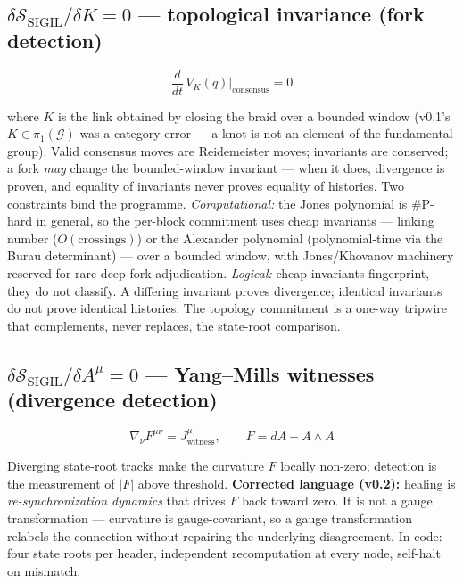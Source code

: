 \documentclass[10pt,a4paper]{article}
\newcommand{\SSIGIL}{\mathcal{S}_{\mathrm{SIGIL}}}
\begin{document}
\subsection{$\delta\SSIGIL/\delta K = 0$ — topological invariance (fork detection)}

\begin{equation}
\frac{d}{dt}\,V_K(q)\Big|_{\mathrm{consensus}} = 0
\end{equation}

where $K$ is the link obtained by closing the braid over a bounded window (v0.1's
$K \in \pi_1(\mathcal{G})$ was a category error — a knot is not an element of the
fundamental group). Valid consensus moves are Reidemeister moves; invariants are
conserved; a fork \emph{may} change the bounded-window invariant — when it does,
divergence is proven, and equality of invariants never proves equality of histories. Two
constraints bind the programme. \emph{Computational:} the Jones polynomial is \#P-hard in general, so the
per-block commitment uses cheap invariants — linking number ($O(\mathrm{crossings})$) or
the Alexander polynomial (polynomial-time via the Burau determinant) — over a bounded
window, with Jones/Khovanov machinery reserved for rare deep-fork adjudication.
\emph{Logical:} cheap invariants fingerprint, they do not classify. A differing invariant
proves divergence; identical invariants do not prove identical histories. The topology
commitment is a one-way tripwire that complements, never replaces, the state-root
comparison.

\subsection{$\delta\SSIGIL/\delta A^\mu = 0$ — Yang--Mills witnesses (divergence
detection)}

\begin{equation}
\nabla_\nu F^{\mu\nu} = J^\mu_{\mathrm{witness}},\qquad F = dA + A\wedge A
\end{equation}

Diverging state-root tracks make the curvature $F$ locally non-zero; detection is the
measurement of $|F|$ above threshold. \textbf{Corrected language (v0.2):} healing is
\emph{re-synchronization dynamics} that drives $F$ back toward zero. It is not a gauge
transformation — curvature is gauge-covariant, so a gauge transformation relabels the
connection without repairing the underlying disagreement. In code: four state roots per
header, independent recomputation at every node, self-halt on mismatch.
\end{document}
